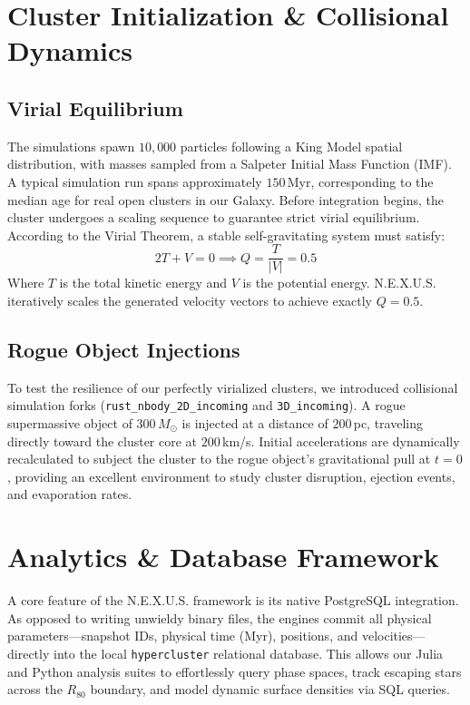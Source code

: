 \documentclass[11pt,a4paper]{article}
\begin{document}
\section{Cluster Initialization \& Collisional Dynamics}

\subsection{Virial Equilibrium}
The simulations spawn $10,000$ particles following a King Model spatial distribution, with masses sampled from a Salpeter Initial Mass Function (IMF). A typical simulation run spans approximately $150$\,Myr, corresponding to the median age for real open clusters in our Galaxy. Before integration begins, the cluster undergoes a scaling sequence to guarantee strict virial equilibrium. According to the Virial Theorem, a stable self-gravitating system must satisfy:
\begin{equation}
    2T + V = 0 \implies Q = \frac{T}{|V|} = 0.5
\end{equation}
Where $T$ is the total kinetic energy and $V$ is the potential energy. N.E.X.U.S. iteratively scales the generated velocity vectors to achieve exactly $Q=0.5$.

\subsection{Rogue Object Injections}
To test the resilience of our perfectly virialized clusters, we introduced collisional simulation forks (\texttt{rust\_nbody\_2D\_incoming} and \texttt{3D\_incoming}). A rogue supermassive object of $300\, M_{\odot}$ is injected at a distance of $200$\,pc, traveling directly toward the cluster core at $200$\,km/s. Initial accelerations are dynamically recalculated to subject the cluster to the rogue object's gravitational pull at $t=0$, providing an excellent environment to study cluster disruption, ejection events, and evaporation rates.

\section{Analytics \& Database Framework}
A core feature of the N.E.X.U.S. framework is its native PostgreSQL integration. As opposed to writing unwieldy binary files, the engines commit all physical parameters—snapshot IDs, physical time (Myr), positions, and velocities—directly into the local \texttt{hypercluster} relational database. This allows our Julia and Python analysis suites to effortlessly query phase spaces, track escaping stars across the $R_{80}$ boundary, and model dynamic surface densities via SQL queries.
\end{document}

